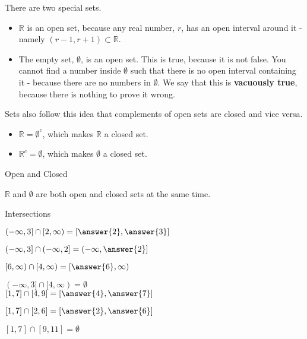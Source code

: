 \documentclass{ximera}
\begin{document}
There are two special sets.

\begin{itemize}
\item $\mathbb{R}$  is an open set, because any real number, $r$, has an open interval around it - namely $(r-1, r+1) \subset \mathbb{R}$.
\item The empty set, $\emptyset$, is an open set.  This is true, because it is not false.  You cannot find a number inside $\emptyset$ such that there is no open interval containing it - because there are no numbers in $\emptyset$.  We say that this is \textbf{vacuously true}, because there is nothing to prove it wrong.
\end{itemize}





Sets also follow this idea that complements of open sets are closed and vice versa.

\begin{itemize}
\item $\mathbb{R} = \emptyset^c$, which makes $\mathbb{R}$ a closed set.
\item $\mathbb{R}^c = \emptyset$, which makes $\emptyset$ a closed set.
\end{itemize}





\begin{fact} Open and Closed

$\mathbb{R}$ and $\emptyset$ are both open and closed sets at the same time.


\end{fact}






\begin{observation} Intersections

$(-\infty, 3] \cap  [2, \infty) = \left[\answer{2}, \answer{3}\right]$

$(-\infty, 3] \cap  (-\infty, 2] = \left(-\infty, \answer{2}\right]$

$[6, \infty)  \cap  [4, \infty) = \left[\answer{6}, \infty\right)$

$(-\infty, 3] \cap  [4, \infty) = \emptyset$ \\






$[1, 7] \cap  [4, 9] = \left[\answer{4}, \answer{7}\right]$

$[1, 7] \cap  [2, 6] = \left[\answer{2}, \answer{6}\right]$

$[1, 7] \cap  [9, 11] = \emptyset$


\end{observation}
\end{document}
